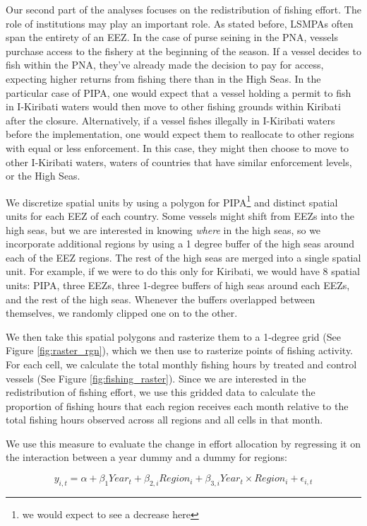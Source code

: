 \documentclass[11pt,]{article}
\let\rmarkdownfootnote\footnote%
\def\footnote{\protect\rmarkdownfootnote}
\begin{document}
Our second part of the analyses focuses on the redistribution of fishing
effort. The role of institutions may play an important role. As stated
before, LSMPAs often span the entirety of an EEZ. In the case of purse
seining in the PNA, vessels purchase access to the fishery at the
beginning of the season. If a vessel decides to fish within the PNA,
they've already made the decision to pay for access, expecting higher
returns from fishing there than in the High Seas. In the particular case
of PIPA, one would expect that a vessel holding a permit to fish in
I-Kiribati waters would then move to other fishing grounds within
Kiribati after the closure. Alternatively, if a vessel fishes illegally
in I-Kiribati waters before the implementation, one would expect them to
reallocate to other regions with equal or less enforcement. In this
case, they might then choose to move to other I-Kiribati waters, waters
of countries that have similar enforcement levels, or the High Seas.

We discretize spatial units by using a polygon for
PIPA\footnote{we would expect to see a decrease here} and distinct
spatial units for each EEZ of each country. Some vessels might shift
from EEZs into the high seas, but we are interested in knowing
\emph{where} in the high seas, so we incorporate additional regions by
using a 1 degree buffer of the high seas around each of the EEZ regions.
The rest of the high seas are merged into a single spatial unit. For
example, if we were to do this only for Kiribati, we would have 8
spatial units: PIPA, three EEZs, three 1-degree buffers of high seas
around each EEZs, and the rest of the high seas. Whenever the buffers
overlapped between themselves, we randomly clipped one on to the other.

We then take this spatial polygons and rasterize them to a 1-degree grid
(See Figure \ref{fig:raster_rgn}), which we then use to rasterize points
of fishing activity. For each cell, we calculate the total monthly
fishing hours by treated and control vessels (See Figure
\ref{fig:fishing_raster}). Since we are interested in the redistribution
of fishing effort, we use this gridded data to calculate the proportion
of fishing hours that each region receives each month relative to the
total fishing hours observed across all regions and all cells in that
month.

We use this measure to evaluate the change in effort allocation by
regressing it on the interaction between a year dummy and a dummy for
regions:

\[
y_{i,t} = \alpha + \beta_1Year_t + \beta_{2,i}Region_i + \beta_{3,i}Year_t \times Region_i+ \epsilon_{i,t}
\]
\end{document}
